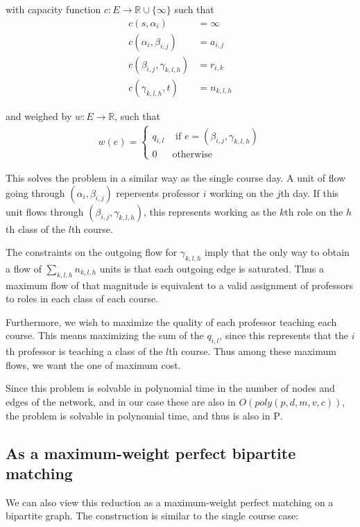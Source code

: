 with capacity function $c:E \to \mathbb{R} \cup \{\infty\}$ such that
\begin{align*}
  c(s, \alpha_i) &= \infty\\
  c(\alpha_i, \beta_{i, j}) &= a_{i, j}\\
  c(\beta_{i, j}, \gamma_{k, l, h}) &= r_{i, k}\\
  c(\gamma_{k, l, h}, t) &= n_{k, l, h}
\end{align*}

and weighed by $w:E \to \mathbb{R}$, such that
\begin{align*}
  w(e) = \begin{cases}
    q_{i, l} & \text{ if } e = (\beta_{i, j}, \gamma_{k, l, h})\\
    0 & \text{otherwise}
  \end{cases}
\end{align*}

This solves the problem in a similar way as the single course day. A unit of flow going through $(\alpha_i, \beta_{i, j})$ repersents professor $i$ working on the $j$th day. If this unit flows through $(\beta_{i, j}, \gamma_{k, l, h})$, this represents working as the $k$th role on the $h$th class of the $l$th course.

The constraints on the outgoing flow for $\gamma_{k, l, h}$ imply that the only way to obtain a flow of $\sum_{k, l, h} n_{k, l, h}$ units is that each outgoing edge is saturated. Thus a maximum flow of that magnitude is equivalent to a valid assignment of professors to roles in each class of each course.

Furthermore, we wish to maximize the quality of each professor teaching each course. This means maximizing the sum of the $q_{i, l}$, since this represents that the $i$th professor is teaching a class of the $l$th course. Thus among these maximum flows, we want the one of maximum cost.

Since this problem is solvable in polynomial time in the number of nodes and edges of the network, and in our case these are also in $O(poly(p, d, m, v, c))$, the problem is solvable in polynomial time, and thus is also in \textsc{P}.


\subsection{As a maximum-weight perfect bipartite matching}
We can also view this reduction as a maximum-weight perfect matching on a bipartite graph. The construction is similar to the single course case:


